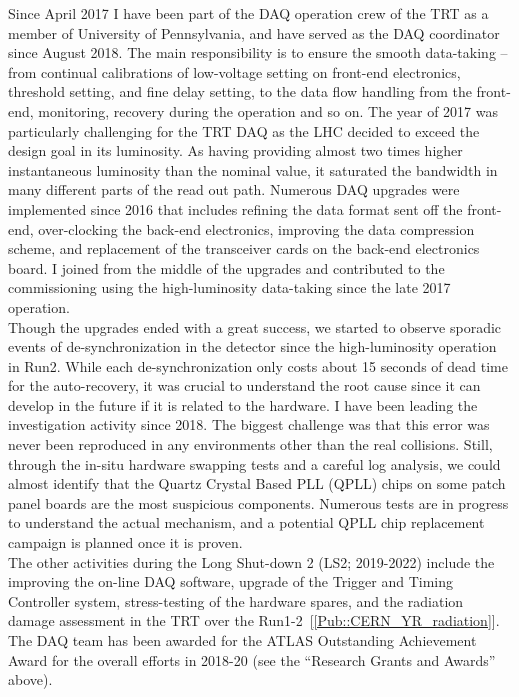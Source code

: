 \documentclass[12pt]{article}
\begin{document}
Since April 2017 I have been part of the DAQ operation crew of the TRT as a member of University of Pennsylvania,
and have served as the DAQ coordinator since August 2018.
The main responsibility is to ensure the smooth data-taking -- from continual calibrations of low-voltage setting on front-end electronics, threshold setting, and fine delay setting,
to the data flow handling from the front-end, monitoring, recovery during the operation and so on.
The year of 2017 was particularly challenging for the TRT DAQ as the LHC decided to exceed the design goal in its luminosity. 
As having providing almost two times higher instantaneous luminosity than the nominal value, it saturated the bandwidth in many different parts of the read out path.
Numerous DAQ upgrades were implemented since 2016 that includes refining the data format sent off the front-end, 
over-clocking the back-end electronics, 
improving the data compression scheme,
and replacement of the transceiver cards on the back-end electronics board.
I joined from the middle of the upgrades and contributed to the commissioning using the high-luminosity data-taking since the late 2017 operation. \\

Though the upgrades ended with a great success, we started to observe sporadic events of de-synchronization in the detector since the high-luminosity operation in Run2.
While each de-synchronization only costs about 15 seconds of dead time for the auto-recovery, 
it was crucial to understand the root cause since it can develop in the future if it is related to the hardware.
I have been leading the investigation activity since 2018.
The biggest challenge was that this error was never been reproduced in any environments other than the real collisions.
Still, through the in-situ hardware swapping tests and a careful log analysis,
we could almost identify that the Quartz Crystal Based PLL (QPLL) chips on some patch panel boards are the most suspicious components.
Numerous tests are in progress to understand the actual mechanism, and a potential QPLL chip replacement campaign is planned once it is proven. \\

The other activities during the Long Shut-down 2 (LS2; 2019-2022) include the improving the on-line DAQ software, 
upgrade of the Trigger and Timing Controller system, stress-testing of the hardware spares, and the radiation damage assessment in the TRT over the Run1-2~[\ref{Pub::CERN_YR_radiation}]. 
The DAQ team has been awarded for the ATLAS Outstanding Achievement Award for the overall efforts in 2018-20 (see the ``Research Grants and Awards'' above). 
\end{document}
